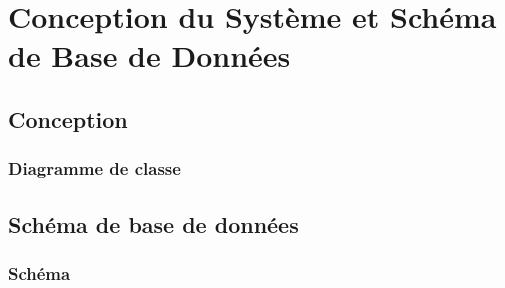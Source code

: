 \chapter{ Conception du Système et Schéma de Base de Données}

\section{Conception}
\subsection{Diagramme de classe}
\section{Schéma de base de données}
\subsection{Schéma}
